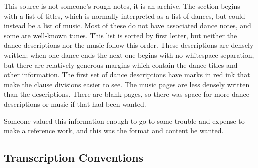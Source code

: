 \documentclass[12pt,letter]{article} %
\begin{document}
This source is not someone's rough notes, it is an archive. The section begins with a list of titles, which is normally interpreted as a list of dances, but could instead be a list of music. Most of these do not have associated dance notes, and some are well-known tunes. This list is sorted by first letter, but neither the dance descriptions nor the music follow this order.   These descriptions are densely written; when one dance ends the next one begins with no whitespace separation, but there are relatively generous margins which contain the dance titles and other information. The first set of dance descriptions have marks in red ink that make the clause divisions easier to see. The music pages are less densely written than the descriptions. There are blank pages, so there was space for more dance descriptions or music if that had been wanted. 

Someone valued this information enough to go to some trouble and expense to make a reference work, and this was the format and content he wanted.

\subsection{Transcription Conventions}
\end{document}
